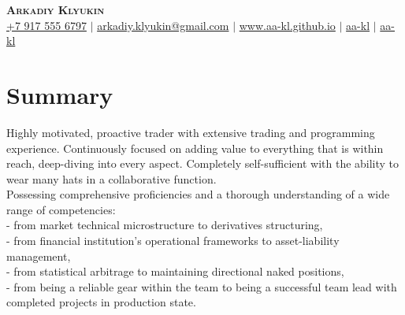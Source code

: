 \documentclass[a4paper,hidelinks,20pt]{article}
\begin{document}

\begin{center}
  \textbf{\Huge \scshape Arkadiy Klyukin} \\ \vspace{1pt}
  \small
  \faMobile \hspace{.5pt} \href{tel:+79175556797}{+7 917 555 6797}
  $|$
  \faAt \hspace{.5pt} \href{mailto:arkadiy.klyukin@gmail.com}{arkadiy.klyukin@gmail.com}
  $|$
  \faGlobe \hspace{.5pt} \href{https://www.aa-kl.github.io}{www.aa-kl.github.io}
  $|$
  \faLinkedinSquare \hspace{.5pt} \href{https://www.linkedin.com/in/aa-kl}{aa-kl}
  $|$
  \faGithub \hspace{.5pt} \href{https://github.com/aa-kl}{aa-kl}
\end{center}

\vspace{-15pt}
\section{Summary}
Highly motivated, proactive trader with extensive trading and programming experience. Continuously focused on adding value to everything that is within reach, deep-diving into every aspect. Completely self-sufficient with the ability to wear many hats in a collaborative function.\\
Possessing comprehensive proficiencies and a thorough understanding of a wide range of competencies:\\
- from market technical microstructure to derivatives structuring,\\
- from financial institution's operational frameworks to asset-liability management,\\
- from statistical arbitrage to maintaining directional naked positions,\\
- from being a reliable gear within the team to being a successful team lead with completed projects in production state.\\

\vspace{-3pt}
\end{document}

